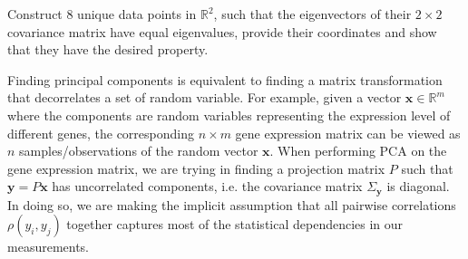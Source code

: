\documentclass[11pt]{exam}
\begin{document}
\begin{questions}
\newpage
\question[10] 
 Construct 8 unique data points in $\mathbb{R}^2$, such that the eigenvectors of their $2\times 2$ covariance matrix have equal eigenvalues, provide their coordinates and show that they have the desired property.


\newpage
\question[10] 
Finding principal components is equivalent to finding a matrix transformation that decorrelates a set of random variable. For example, given a vector $\mathbf{x} \in \mathbb{R}^m$ where the components are random variables representing the expression level of different genes, the corresponding $n \times m$ gene expression matrix can be viewed as $n$ samples/observations of the random vector $\mathbf{x}$. When performing PCA on the gene expression matrix, we are trying in finding a projection matrix $P$ such that $\mathbf{y} = P\mathbf{x}$ has uncorrelated components, i.e. the covariance matrix $\Sigma_\mathbf{y}$ is diagonal. In doing so, we are making the implicit assumption that all pairwise correlations $\rho(y_i,y_j)$ together captures most of the statistical dependencies in our measurements.
\begin{parts}

\end{parts}
\end{questions}
\end{document}
